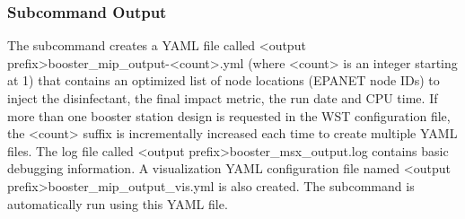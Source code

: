 \subsubsection{Subcommand Output}
The  subcommand creates a YAML file called <output prefix>booster\_mip\_output-<count>.yml
(where <count> is an integer starting at 1) that
contains an optimized list of node locations (EPANET node IDs) to inject the disinfectant,
the final impact metric, the run date and CPU time. 
If more than one booster station design is requested in the WST configuration file, the <count> suffix 
is incrementally increased each time to create multiple YAML files.
The log file called <output prefix>booster\_msx\_output.log contains basic debugging information.
A visualization YAML configuration file named <output prefix>booster\_mip\_output\_vis.yml is also created.
The  subcommand is automatically run using this YAML file.


